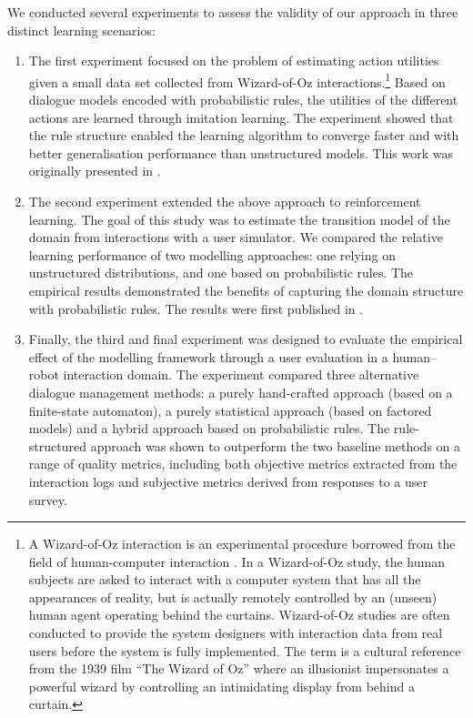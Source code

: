 We conducted several experiments to assess the validity of our approach in three distinct learning scenarios: \begin{enumerate} %

\item The first experiment focused on the problem of estimating action utilities given a small data set collected from Wizard-of-Oz interactions.\footnote{A Wizard-of-Oz interaction is an experimental procedure borrowed from the field of human-computer interaction \citep{woz93}. In a Wizard-of-Oz study, the human subjects are asked to interact with a computer system that has all the appearances of reality, but is actually remotely controlled by an (unseen) human agent operating behind the curtains.  Wizard-of-Oz studies are often conducted to provide the system designers with interaction data from real users before the system is fully implemented.  The term is a cultural reference from the 1939 film ``The Wizard of Oz'' where an illusionist impersonates a powerful wizard by controlling an intimidating display from behind a curtain.}  Based on dialogue models encoded with probabilistic rules, the utilities of the different actions are learned through imitation learning. The experiment showed that the rule structure enabled the learning algorithm to converge faster and with better generalisation performance than unstructured models. This work was originally presented in \cite{rulebasedmodels-sigdial2012}. 
\item The second experiment extended the above approach to reinforcement learning. The goal of this study was to estimate the transition model of the domain from interactions with a user simulator. We compared the relative learning performance of two modelling approaches: one relying on unstructured distributions, and one based on probabilistic rules. The empirical results demonstrated the benefits of capturing the domain structure with probabilistic rules. The results were first published in \cite{interspeech2013}. 
\item Finally, the third and final experiment was designed to evaluate the empirical effect of the modelling framework through a user evaluation in a human--robot interaction domain. The experiment compared three alternative dialogue management methods: a purely hand-crafted approach (based on a finite-state automaton), a purely statistical approach (based on factored models) and a hybrid approach based on probabilistic rules. The rule-structured approach was shown to outperform the two baseline methods on a range of quality metrics, including both objective metrics extracted from the interaction logs and subjective metrics derived from responses to a user survey. 
\end{enumerate}

